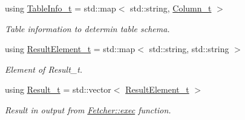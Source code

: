 \begin{DoxyCompactItemize}
using \hyperlink{namespacesf_a4427debefb8b5121ea783ab2a93a8e50}{Table\+Info\+\_\+t} = std\+::map$<$ std\+::string, \hyperlink{namespacesf_a390d6a976138adf32ace872bbd298a30}{Column\+\_\+t} $>$
\begin{DoxyCompactList}\small\item\em Table information to determin table schema. \end{DoxyCompactList}\item 
\mbox{\label{namespacesf_ad978dd32536dafd22c05284f5c639635}} 
using \hyperlink{namespacesf_ad978dd32536dafd22c05284f5c639635}{Result\+Element\+\_\+t} = std\+::map$<$ std\+::string, std\+::string $>$
\begin{DoxyCompactList}\small\item\em Element of Result\+\_\+t. \end{DoxyCompactList}\item 
\mbox{\label{namespacesf_a32e7fd33812e38a9ac4df7652c3adec2}} 
using \hyperlink{namespacesf_a32e7fd33812e38a9ac4df7652c3adec2}{Result\+\_\+t} = std\+::vector$<$ \hyperlink{namespacesf_ad978dd32536dafd22c05284f5c639635}{Result\+Element\+\_\+t} $>$
\begin{DoxyCompactList}\small\item\em Result in output from \hyperlink{classsf_1_1Fetcher_a1f89a1897ae6f8f4aaf66e4a81a2ac23}{Fetcher\+::exec} function. \end{DoxyCompactList}\end{DoxyCompactItemize}
